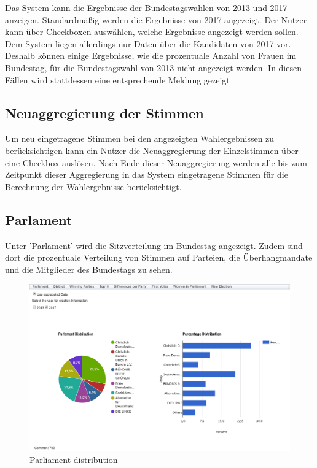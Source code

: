 \documentclass[a4paper]{scrreprt}
\begin{document}
Das System kann die Ergebnisse der Bundestagswahlen von 2013 und 2017 anzeigen. Standardmäßig werden die Ergebnisse von 2017 angezeigt. Der Nutzer kann über Checkboxen auswählen, welche Ergebnisse angezeigt werden sollen. Dem System liegen allerdings nur Daten über die Kandidaten von 2017 vor. Deshalb können einige Ergebnisse, wie die prozentuale Anzahl von Frauen im Bundestag, für die Bundestagswahl von 2013 nicht angezeigt werden. In diesen Fällen wird stattdessen eine entsprechende Meldung gezeigt


\subsection{Neuaggregierung der Stimmen}

Um neu eingetragene Stimmen bei den angezeigten Wahlergebnissen zu berücksichtigen kann ein Nutzer die Neuaggregierung der Einzelstimmen über eine Checkbox auslösen. Nach Ende dieser Neuaggregierung werden alle bis zum Zeitpunkt dieser Aggregierung in das System eingetragene Stimmen für die Berechnung der Wahlergebnisse berücksichtigt.


\subsection{Parlament}

Unter 'Parlament' wird die Sitzverteilung im Bundestag angezeigt. Zudem sind dort die prozentuale Verteilung von Stimmen auf Parteien,  die Überhangmandate und die Mitglieder des Bundestags zu sehen. 

\begin{figure}[H]
\centering
\includegraphics[width=\textwidth]{images/parliament_distribution.png}
\caption {Parliament distribution}
\end{figure}
\end{document}
